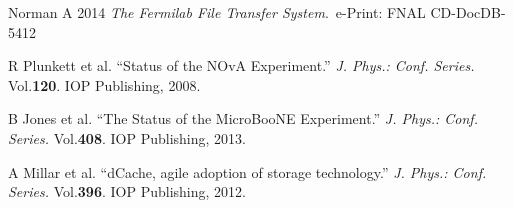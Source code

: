 \documentclass[pdftex,12pt,letter]{article}
\begin{document}
\begin{thebibliography}{9}
Norman A 2014 \textit{The Fermilab File Transfer System}.~e-Print: FNAL CD-DocDB-5412

R Plunkett et al.  ``Status of the NOvA Experiment.''  \textit{J. Phys.: Conf. Series.} Vol.\textbf{120}. IOP Publishing, 2008.



B Jones et al.  ``The Status of the MicroBooNE Experiment.''  \textit{J. Phys.: Conf. Series.} Vol.\textbf{408}. IOP Publishing, 2013.


A Millar et al.  ``dCache, agile adoption of storage technology.''  \textit{J. Phys.: Conf. Series.} Vol.\textbf{396}. IOP Publishing, 2012.


\end{thebibliography}
\end{document}
